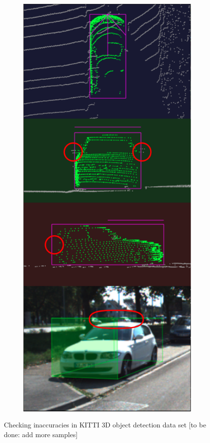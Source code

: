 \documentclass[letterpaper, 10 pt, conference]{ieeeconf}  %
\begin{document}
\begin{figure}
\begin{subfigure}{0.3\linewidth}
		\includegraphics[scale=0.2]{./figures/annocheck}
	\end{subfigure}
	
	\caption{Checking inaccuracies in KITTI 3D object detection data set [to be done: add more samples]}
	\label{fig:annocheck}
\end{figure}
\end{document}
